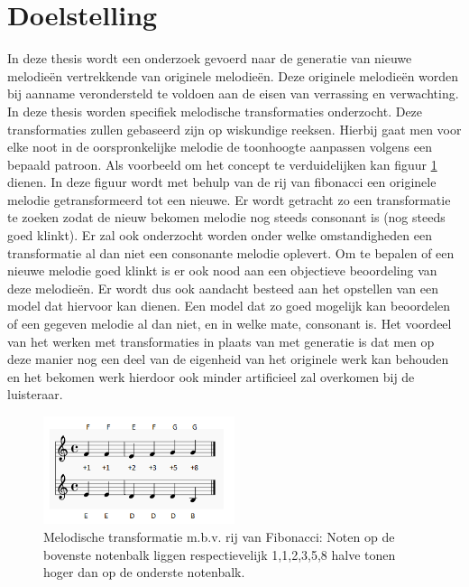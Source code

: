 \section{Doelstelling}
In deze thesis wordt een onderzoek gevoerd naar de generatie van nieuwe melodie\"en vertrekkende van originele melodie\"en. Deze originele melodie\"en worden bij aanname verondersteld te voldoen aan de eisen van verrassing en verwachting. In deze thesis worden specifiek melodische transformaties onderzocht. Deze transformaties zullen gebaseerd zijn op wiskundige reeksen. Hierbij gaat men voor elke noot in de oorspronkelijke melodie de toonhoogte aanpassen volgens een bepaald patroon. Als voorbeeld om het concept te verduidelijken kan figuur \ref{figuur:fibo} dienen. In deze figuur wordt met behulp van de rij van fibonacci een originele melodie getransformeerd tot een nieuwe. Er wordt getracht zo een transformatie te zoeken zodat de nieuw bekomen melodie nog steeds consonant is (nog steeds goed klinkt). Er zal ook onderzocht worden onder welke omstandigheden een transformatie al dan niet een consonante melodie oplevert. Om te bepalen of een nieuwe melodie goed klinkt is er ook nood aan een objectieve beoordeling van deze melodie\"en. Er wordt dus ook aandacht besteed aan het opstellen van een model dat hiervoor kan dienen. Een model dat zo goed mogelijk kan beoordelen of een gegeven melodie al dan niet, en in welke mate, consonant is. Het voordeel van het werken met transformaties in plaats van met generatie is dat men op deze manier nog een deel van de eigenheid van het originele werk kan behouden en het bekomen werk hierdoor ook minder artificieel zal overkomen bij de luisteraar.

\begin{figure}[!ht]
  \centering
  \includegraphics[width=0.5\textwidth]{0_Inleiding/fibo}
  \caption{Melodische transformatie m.b.v. rij van Fibonacci: Noten op de bovenste notenbalk liggen respectievelijk 1,1,2,3,5,8 halve tonen hoger dan op de onderste notenbalk.}
  \label{figuur:fibo}
\end{figure}

